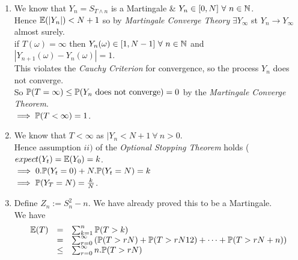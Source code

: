 \documentclass[11pt,a4paper]{article}
\begin{document}
\begin{enumerate}
	\item We know that $Y_n=S_{T\wedge n}$ is a Martingale \& $Y_n\in[0,N]\ \forall\ n\in\nats$.\\
	Hence $\mathbb{E}(|Y_n|)<N+1$ so by \textit{Martingale Converge Theory} $\exists Y_\infty$ st $Y_n\to Y_\infty$ almost surely.\\
	if $T(\omega)=\infty$ then $Y_n(\omega)\in[1,N-1]\ \forall\ n\in\nats$ and $|Y_{n+1}(\omega)-Y_n(\omega)|=1$.\\
	This violates the \textit{Cauchy Criterion} for convergence, so the process $Y_n$ does not converge.\\
	So $\prob(T=\infty)\leq\prob(Y_n\ \mathrm{does\ not\ converge})=0$ by the \textit{Martingale Converge Theorem}.\\
	$\implies \mathbb{P}(T<\infty)=1$.
	\item We know that $T<\infty$ as $|Y_n<N+1\ \forall\ n>0$.\\
	Hence assumption $ii)$ of the \textit{Optional Stopping Theorem} holds ($expect(Y_t)=\mathbb{E}(Y_0)=k$.\\
	$\implies 0.\mathbb{P}(Y_t=0)+N.\mathbb{P}(Y_t=N)=k$\\
	$\implies\mathbb{P}(Y_T=N)=\frac{k}{N}$.
	\item Define $Z_n:=S_n^2-n$. We have already proved this to be a Martingale.\\
	We have
	\[\begin{array}{rcl}
	\mathbb{E}(T)&=&\sum_{k=1}^n\mathbb{P}(T>k)\\
	&=&\sum_{r=0}^\infty\left(\mathbb{P}(T>rN)+\mathbb{P}(T>rN12)+\dots+\mathbb{P}(T>rN+n)\right)\\
	&\leq&\sum_{r=0}^\infty n.\mathbb{P}(T>rN)
	\end{array}\]
	

\end{enumerate}
\end{document}
